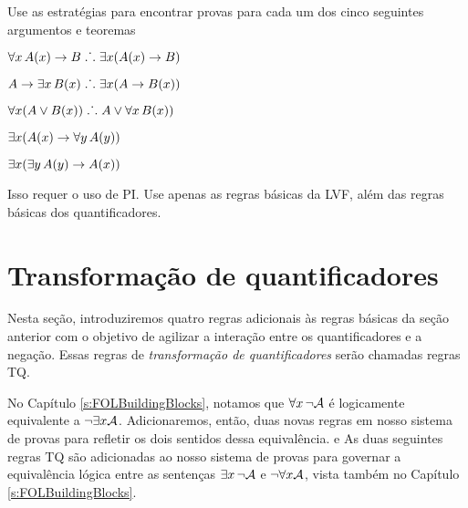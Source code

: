 \problempart
Use as estratégias para encontrar provas para cada um dos cinco seguintes argumentos e teoremas
\begin{earg}
\item $\forall x\,\mathord{A}(x) \rightarrow B \mathrel{\ldotp\dot{}\,\ldotp} \exists x(\mathord{A}(x) \rightarrow B)$
\item $A \rightarrow \exists x\, \mathord{B}(x) \mathrel{\ldotp\dot{}\,\ldotp} \exists x(A \rightarrow \mathord{B}(x))$
\item $\forall x(A \vee \mathord{B}(x)) \mathrel{\ldotp\dot{}\,\ldotp} A \vee \forall x\,\mathord{B}(x))$
\item $\exists x(\mathord{A}(x) \rightarrow \forall y\,\mathord{A}(y))$
\item $\exists x(\exists y\,\mathord{A}(y) \rightarrow \mathord{A}(x))$
\end{earg}
Isso requer o uso de PI. Use apenas as regras básicas da LVF, além das regras básicas dos quantificadores.


\chapter{Transformação de quantificadores}\label{s:CQ}

Nesta seção, introduziremos quatro regras adicionais às regras básicas da seção anterior com o objetivo de agilizar a interação entre os quantificadores e a negação. Essas regras de \textit{transformação de quantificadores} serão chamadas regras TQ.
 
No Capítulo  \ref{s:FOLBuildingBlocks}, notamos que $\forall x\, \neg\mathcal{A}$
   é logicamente equivalente a  $\neg\exists x\mathcal{A}$. Adicionaremos, então, duas novas regras em nosso sistema de provas para refletir os dois sentidos dessa equivalência.
e
As duas seguintes  regras TQ  são adicionadas ao nosso sistema de provas para governar a equivalência lógica entre as sentenças $\exists x\, \neg\mathcal{A}$  e   $\neg\forall x\mathcal{A}$, vista também no  Capítulo  \ref{s:FOLBuildingBlocks}.

